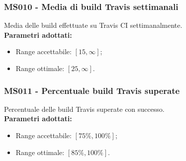 \subsubsection{MS010 - Media di build Travis settimanali}\mbox{}
Media delle build effettuate su Travis CI settimanalmente.\\[0,2cm]
\textbf{Parametri adottati:}
\begin{itemize}
	\item Range accettabile: $[15,\infty]$;
	\item Range ottimale: $[25,\infty]$.
\end{itemize}

\subsubsection{MS011 - Percentuale build Travis superate}\mbox{}
Percentuale delle build Travis superate con successo.\\[0,2cm]
\textbf{Parametri adottati:}
\begin{itemize}
	\item Range accettabile: $[75\%,100\%]$;
	\item Range ottimale: $[85\%,100\%]$.
\end{itemize}